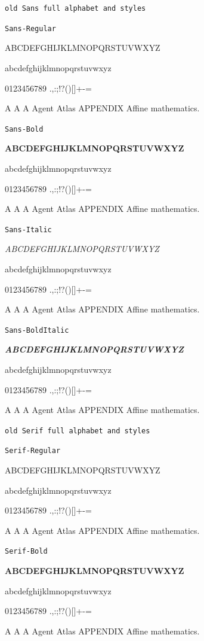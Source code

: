 \documentclass[12pt]{article}
\begin{document}
\texttt{old Sans full alphabet and styles}\par
\texttt{Sans-Regular}\par
{\SansFont\fontsize{13}{17}\selectfont ABCDEFGHIJKLMNOPQRSTUVWXYZ\par abcdefghijklmnopqrstuvwxyz\par 0123456789 .,:;!?()[]+-=\par A A A Agent Atlas APPENDIX Affine mathematics.\par}
\texttt{Sans-Bold}\par
{\SansFont\bfseries\fontsize{13}{17}\selectfont ABCDEFGHIJKLMNOPQRSTUVWXYZ\par abcdefghijklmnopqrstuvwxyz\par 0123456789 .,:;!?()[]+-=\par A A A Agent Atlas APPENDIX Affine mathematics.\par}
\texttt{Sans-Italic}\par
{\SansFont\itshape\fontsize{13}{17}\selectfont ABCDEFGHIJKLMNOPQRSTUVWXYZ\par abcdefghijklmnopqrstuvwxyz\par 0123456789 .,:;!?()[]+-=\par A A A Agent Atlas APPENDIX Affine mathematics.\par}
\texttt{Sans-BoldItalic}\par
{\SansFont\bfseries\itshape\fontsize{13}{17}\selectfont ABCDEFGHIJKLMNOPQRSTUVWXYZ\par abcdefghijklmnopqrstuvwxyz\par 0123456789 .,:;!?()[]+-=\par A A A Agent Atlas APPENDIX Affine mathematics.\par}
\newpage
\texttt{old Serif full alphabet and styles}\par
\texttt{Serif-Regular}\par
{\rmfamily\fontsize{13}{17}\selectfont ABCDEFGHIJKLMNOPQRSTUVWXYZ\par abcdefghijklmnopqrstuvwxyz\par 0123456789 .,:;!?()[]+-=\par A A A Agent Atlas APPENDIX Affine mathematics.\par}
\texttt{Serif-Bold}\par
{\rmfamily\bfseries\fontsize{13}{17}\selectfont ABCDEFGHIJKLMNOPQRSTUVWXYZ\par abcdefghijklmnopqrstuvwxyz\par 0123456789 .,:;!?()[]+-=\par A A A Agent Atlas APPENDIX Affine mathematics.\par}
\end{document}
